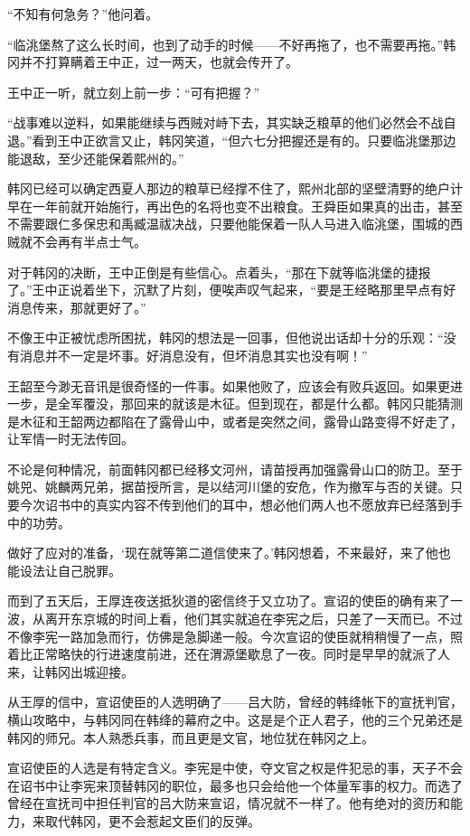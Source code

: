 “不知有何急务？”他问着。

“临洮堡熬了这么长时间，也到了动手的时候——不好再拖了，也不需要再拖。”韩冈并不打算瞒着王中正，过一两天，也就会传开了。

王中正一听，就立刻上前一步：“可有把握？”

“战事难以逆料，如果能继续与西贼对峙下去，其实缺乏粮草的他们必然会不战自退。”看到王中正欲言又止，韩冈笑道，“但六七分把握还是有的。只要临洮堡那边能退敌，至少还能保着熙州的。”

韩冈已经可以确定西夏人那边的粮草已经撑不住了，熙州北部的坚壁清野的绝户计早在一年前就开始施行，再出色的名将也变不出粮食。王舜臣如果真的出击，甚至不需要跟仁多保忠和禹臧温祓决战，只要他能保着一队人马进入临洮堡，围城的西贼就不会再有半点士气。

对于韩冈的决断，王中正倒是有些信心。点着头，“那在下就等临洮堡的捷报了。”王中正说着坐下，沉默了片刻，便唉声叹气起来，“要是王经略那里早点有好消息传来，那就更好了。”

不像王中正被忧虑所困扰，韩冈的想法是一回事，但他说出话却十分的乐观：“没有消息并不一定是坏事。好消息没有，但坏消息其实也没有啊！”

王韶至今渺无音讯是很奇怪的一件事。如果他败了，应该会有败兵返回。如果更进一步，是全军覆没，那回来的就该是木征。但到现在，都是什么都。韩冈只能猜测是木征和王韶两边都陷在了露骨山中，或者是突然之间，露骨山路变得不好走了，让军情一时无法传回。

不论是何种情况，前面韩冈都已经移文河州，请苗授再加强露骨山口的防卫。至于姚兕、姚麟两兄弟，据苗授所言，是以结河川堡的安危，作为撤军与否的关键。只要今次诏书中的真实内容不传到他们的耳中，想必他们两人也不愿放弃已经落到手中的功劳。

做好了应对的准备，‘现在就等第二道信使来了。’韩冈想着，不来最好，来了他也能设法让自己脱罪。

而到了五天后，王厚连夜送抵狄道的密信终于又立功了。宣诏的使臣的确有来了一波，从离开东京城的时间上看，他们其实就追在李宪之后，只差了一天而已。不过不像李宪一路加急而行，仿佛是急脚递一般。今次宣诏的使臣就稍稍慢了一点，照着比正常略快的行进速度前进，还在渭源堡歇息了一夜。同时是早早的就派了人来，让韩冈出城迎接。

从王厚的信中，宣诏使臣的人选明确了——吕大防，曾经的韩绛帐下的宣抚判官，横山攻略中，与韩冈同在韩绛的幕府之中。这是是个正人君子，他的三个兄弟还是韩冈的师兄。本人熟悉兵事，而且更是文官，地位犹在韩冈之上。

宣诏使臣的人选是有特定含义。李宪是中使，夺文官之权是件犯忌的事，天子不会在诏书中让李宪来顶替韩冈的职位，最多也只会给他一个体量军事的权力。而选了曾经在宣抚司中担任判官的吕大防来宣诏，情况就不一样了。他有绝对的资历和能力，来取代韩冈，更不会惹起文臣们的反弹。

